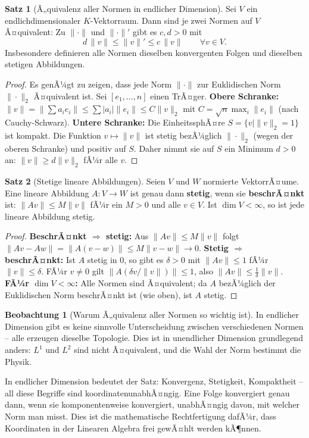 ﻿\documentclass[a4paper,12pt]{report}
\theoremstyle{definition}
\newtheorem{satz}{Satz}
\newtheorem{beobachtung}{Beobachtung}
\begin{document}
\begin{satz}[Ã„quivalenz aller Normen in endlicher Dimension]
    Sei $V$ ein endlichdimensionaler $K$-Vektorraum. Dann sind je zwei
    Normen auf $V$ Ã¤quivalent: Zu $\|\cdot\|$ und $\|\cdot\|'$
    gibt es $c, d > 0$ mit
    \[
        d\, \|v\| \leq \|v\|' \leq c\, \|v\| \qquad \forall v \in V.
    \]
    Insbesondere definieren alle Normen dieselben konvergenten Folgen
    und dieselben stetigen Abbildungen.
\end{satz}
\begin{proof}
    Es genÃ¼gt zu zeigen, dass jede Norm $\|\cdot\|$ zur Euklidischen Norm
    $\|\cdot\|_2$ Ã¤quivalent ist. Sei $[e_1, \ldots, n]$ einen TrÃ¤ger.
    \textbf{Obere Schranke:} $\|v\| = \|\sum a_i e_i\| \leq \sum |a_i| \|e_i\|
    \leq C \|v\|_2$ mit $C = \sqrt{n} \max_i \|e_i\|$ (nach Cauchy-Schwarz).
    \textbf{Untere Schranke:} Die EinheitssphÃ¤re $S = \{v \mid \|v\|_2 = 1\}$
    ist kompakt. Die Funktion $v \mapsto \|v\|$ ist stetig bezÃ¼glich $\|\cdot\|_2$
    (wegen der oberen Schranke) und positiv auf $S$. Daher nimmt sie auf $S$
    ein Minimum $d > 0$ an: $\|v\| \geq d \|v\|_2$ fÃ¼r alle $v$.
\end{proof}


\begin{satz}[Stetige lineare Abbildungen]
    Seien $V$ und $W$ normierte VektorrÃ¤ume. Eine lineare Abbildung
    $A : V \to W$ ist genau dann \textbf{stetig}, wenn sie
    \textbf{beschrÃ¤nkt} ist: $\|Av\| \leq M\|v\|$ fÃ¼r ein $M > 0$
    und alle $v \in V$. Ist $\dim V < \infty$, so ist jede lineare
    Abbildung stetig.
\end{satz}
\begin{proof}
    \textbf{BeschrÃ¤nkt $\Rightarrow$ stetig:} Aus $\|Av\| \leq M\|v\|$ folgt
    $\|Av - Aw\| = \|A(v-w)\| \leq M\|v-w\| \to 0$.
    \textbf{Stetig $\Rightarrow$ beschrÃ¤nkt:} Ist $A$ stetig in $0$, so gibt es
    $\delta > 0$ mit $\|Av\| \leq 1$ fÃ¼r $\|v\| \leq \delta$.
    FÃ¼r $v \neq 0$ gilt $\|A(\delta v / \|v\|)\| \leq 1$, also $\|Av\| \leq \frac{1}{\delta}\|v\|$.
    \textbf{FÃ¼r $\dim V < \infty$:} Alle Normen sind Ã¤quivalent; da $A$ bezÃ¼glich
    der Euklidischen Norm beschrÃ¤nkt ist (wie oben), ist $A$ stetig.
\end{proof}


\begin{beobachtung}[Warum Ã„quivalenz aller Normen so wichtig ist]
    In endlicher Dimension gibt es keine sinnvolle Unterscheidung zwischen
    verschiedenen Normen -- alle erzeugen dieselbe Topologie. Dies ist
    in unendlicher Dimension grundlegend anders: $L^1$ und $L^2$ sind
    nicht Ã¤quivalent, und die Wahl der Norm bestimmt die Physik.

    In endlicher Dimension bedeutet der Satz: Konvergenz, Stetigkeit,
    Kompaktheit -- all diese Begriffe sind koordinatenunabhÃ¤ngig.
    Eine Folge konvergiert genau dann, wenn sie komponentenweise konvergiert,
    unabhÃ¤ngig davon, mit welcher Norm man misst. Dies ist die
    mathematische Rechtfertigung dafÃ¼r, dass Koordinaten in der
    Linearen Algebra frei gewÃ¤hlt werden kÃ¶nnen.
\end{beobachtung}
\end{document}
